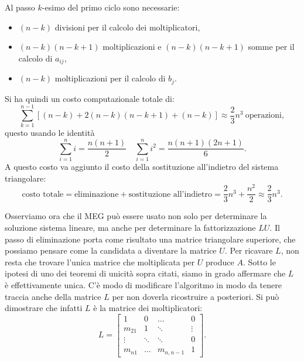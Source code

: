Al passo $k$-esimo del primo ciclo sono necessarie:
\begin{itemize}
\item $( n-k)$ divisioni per il calcolo dei moltiplicatori,
\item $( n-k)( n-k+1)$ moltiplicazioni e $( n-k)( n-k+1)$ somme per il calcolo di $a_{ij}$,
\item $( n-k)$ moltiplicazioni per il calcolo di $b_{j}$.
\end{itemize}
Si ha quindi un costo computazionale totale di:
\begin{equation*}
\sum\limits ^{n-1}_{k=1}[( n-k) +2( n-k)( n-k+1) +( n-k)] \approx \frac{2}{3} n^{3} \ \text{operazioni},
\end{equation*}
questo usando le identità
\begin{equation*}
\sum\limits ^{n}_{i=1} i=\frac{n( n+1)}{2} \quad \sum\limits ^{n}_{i=1} i^{2} =\frac{n( n+1)( 2n+1)}{6}.
\end{equation*}
A questo costo va aggiunto il costo della sostituzione all'indietro del sistema triangolare:
\begin{equation*}
\text{costo totale} = \text{eliminazione} +\text{sostituzione all'indietro} = \frac{2}{3} n^{3} +\frac{n^{2}}{2} \approx \frac{2}{3} n^{3}.
\end{equation*}

Osserviamo ora che il MEG può essere usato non solo per determinare la soluzione sistema lineare, ma anche per determinare la fattorizzazione $LU$. Il passo di eliminazione porta come risultato una matrice triangolare superiore, che possiamo pensare come la candidata a diventare la matrice $U$.
Per ricavare $\displaystyle L$, non resta che trovare l'unica matrice che moltiplicata per $\displaystyle U$ produce $\displaystyle A$.
Sotto le ipotesi di uno dei teoremi di unicità sopra citati, siamo in grado affermare che $L$ è effettivamente unica.
C'è modo di modificare l'algoritmo in modo da tenere traccia anche della matrice $\displaystyle L$ per non doverla ricostruire a posteriori. Si può dimostrare che infatti $L$ è la matrice dei moltiplicatori:
\begin{equation*}
L=\begin{bmatrix}
1 & 0 & \dotsc  & 0\\
m_{21} & 1 & \ddots  & \vdots \\
\vdots  & \ddots  & \ddots  & 0\\
m_{n1} & \dotsc  & m_{n,n-1} & 1
\end{bmatrix}.
\end{equation*}

